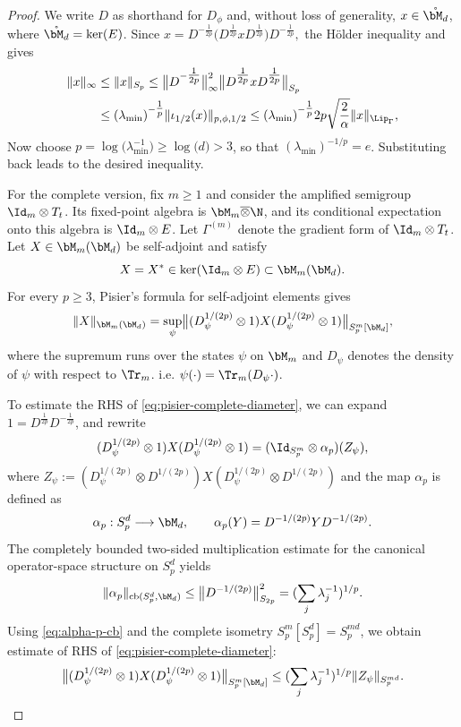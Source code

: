 \documentclass[sn-mathphys-num]{sn-jnl}
\begin{document}
\begin{proof}
We write $D$ as shorthand for $D_\phi$ and, without loss of generality,
$x\in\mathring{\bM_d}$, where $\mathring{\bM_d}=\ker(E)$. Since $x
=
D^{-\frac1{2p}}
 \bigl(D^{\frac1{2p}} x D^{\frac1{2p}}\bigr)
 D^{-\frac1{2p}},$
the Hölder inequality and  gives
\begin{align*}
\|x\|_{\infty}
&\le \|x\|_{S_p} \le
\bigl\|D^{-\tfrac1{2p}}\bigr\|_{\infty}^{2}
\bigl\|D^{\tfrac1{2p}} x D^{\tfrac1{2p}}\bigr\|_{S_p} \\
&\le (\lambda_{\min})^{-\tfrac1p}
\|\iota_{1/2}(x)\|_{p,\phi,1/2} \le
(\lambda_{\min})^{-\tfrac1p} 2p
\sqrt{\frac{2}{\alpha}} \|x\|_{\Lip_\Gamma},
\end{align*}
Now choose
$
p = \log\bigl(\lambda_{\min}^{-1}\bigr)\ge \log\bigl(d\bigr)>3
$,
so that $(\lambda_{\min})^{-1/p}=e$.  Substituting back leads to the desired inequality.

For the complete version, fix $m\ge1$ and consider the amplified
semigroup $\Id_m\otimes T_t$. Its fixed-point algebra is
$\bM_m\overline{\otimes}\N$, and its conditional expectation onto this
algebra is $\Id_m\otimes E$. Let
$\Gamma^{(m)}$ denote the gradient form of $\Id_m\otimes T_t$. Let $X\in\bM_m(\bM_d)$ be self-adjoint and satisfy
\[
  X=X^*\in\ker(\Id_m\otimes E)\subset\bM_m(\bM_d).
\]
For every $p\ge3$, Pisier's formula for self-adjoint elements
\cite{Pisier_1996} gives
\begin{equation}\label{eq:pisier-complete-diameter}
  \|X\|_{\bM_m(\bM_d)}
  =
  \sup_{\psi}
  \bigl\|(D_\psi^{1/(2p)}\otimes1)X
  (D_\psi^{1/(2p)}\otimes1)\bigr\|_{S_p^m[\bM_d]},
\end{equation}
where the supremum runs over the states $\psi$ on $\bM_m$ and $D_\psi$ denotes
the density of $\psi$ with respect to $\Tr_m$. i.e. $\psi(\cdot)=\Tr_m(D_\psi\cdot)$.

To estimate the RHS of
\cref{eq:pisier-complete-diameter}, we can expand $1=D^{\frac1{2p}}D^{-\frac1{2p}}$, and rewrite
\[(D_\psi^{1/(2p)}\otimes1)X
  (D_\psi^{1/(2p)}\otimes1)=(\Id_{S_p^m}\otimes\alpha_p)(Z_\psi),
\]
where $Z_\psi:=(D_\psi^{1/(2p)}\otimes D^{1/(2p)})X(D_\psi^{1/(2p)}\otimes D^{1/(2p)})$ and the map $\alpha_p$ is defined as
\[
  \alpha_p:S_p^d\longrightarrow\bM_d,
  \qquad
  \alpha_p(Y)=D^{-1/(2p)}YD^{-1/(2p)}.
\]
The completely bounded two-sided multiplication estimate for the canonical
operator-space structure on $S_p^d$ \cite{AST_1998__247__R1_0} yields
\begin{equation}\label{eq:alpha-p-cb}
  \|\alpha_p\|_{\mathrm{cb}(S_p^d,\bM_d)}
  \le
  \bigl\|D^{-1/(2p)}\bigr\|_{S_{2p}}^2
  =
  (\sum_j\lambda_j^{-1})^{1/p}.
\end{equation}
Using \cref{eq:alpha-p-cb} and the complete isometry
$S_p^m[S_p^d]=S_p^{md}$, we obtain estimate of RHS of \cref{eq:pisier-complete-diameter}:
\begin{equation}
\bigl\|(D_\psi^{1/(2p)}\otimes1)X
  (D_\psi^{1/(2p)}\otimes1)\bigr\|_{S_p^m[\bM_d]}
  \le
  (\sum_j\lambda_j^{-1})^{1/p}
  \|Z_\psi\|_{S_p^{md}}.
  \label{eq:complete-diameter-factorization}
\end{equation}


\end{proof}
\end{document}
